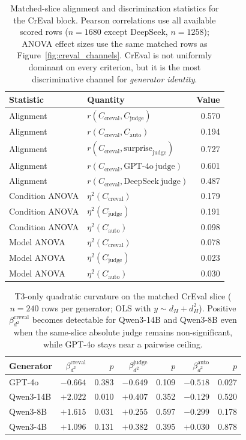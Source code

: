 \documentclass[sigconf,nonacm]{acmart}
\begin{document}
\begin{table}[t]
\centering
\small
\begin{tabular}{llr}
\toprule
Statistic & Quantity & Value \\
\midrule
Alignment & $r(C_{\mathrm{creval}}, C_{\mathrm{judge}})$ & 0.570 \\
Alignment & $r(C_{\mathrm{creval}}, C_{\mathrm{auto}})$ & 0.194 \\
Alignment & $r(C_{\mathrm{creval}}, \mathrm{surprise}_{\mathrm{judge}})$ & 0.727 \\
Alignment & $r(C_{\mathrm{creval}}, \mathrm{GPT\mbox{-}4o\ judge})$ & 0.601 \\
Alignment & $r(C_{\mathrm{creval}}, \mathrm{DeepSeek\ judge})$ & 0.487 \\
Condition ANOVA & $\eta^2(C_{\mathrm{creval}})$ & 0.179 \\
Condition ANOVA & $\eta^2(C_{\mathrm{judge}})$ & 0.191 \\
Condition ANOVA & $\eta^2(C_{\mathrm{auto}})$ & 0.098 \\
Model ANOVA & $\eta^2(C_{\mathrm{creval}})$ & 0.078 \\
Model ANOVA & $\eta^2(C_{\mathrm{judge}})$ & 0.023 \\
Model ANOVA & $\eta^2(C_{\mathrm{auto}})$ & 0.030 \\
\bottomrule
\end{tabular}
\caption{Matched-slice alignment and discrimination statistics for the CrEval block. Pearson correlations use all available scored rows ($n{=}1680$ except DeepSeek, $n{=}1258$); ANOVA effect sizes use the same matched rows as Figure~\ref{fig:creval_channels}. CrEval is not uniformly dominant on every criterion, but it is the most discriminative channel for \emph{generator identity}.}
\label{tab:creval_alignment}
\end{table}

\begin{table}[t]
\centering
\small
\begin{tabular}{lrrrrrr}
\toprule
Generator & $\beta_{d^2}^{\mathrm{creval}}$ & $p$ & $\beta_{d^2}^{\mathrm{judge}}$ & $p$ & $\beta_{d^2}^{\mathrm{auto}}$ & $p$ \\
\midrule
GPT-4o & $-0.664$ & 0.383 & $-0.649$ & 0.109 & $-0.518$ & 0.027 \\
Qwen3-14B & $+2.022$ & 0.010 & $+0.407$ & 0.352 & $-0.129$ & 0.520 \\
Qwen3-8B & $+1.615$ & 0.031 & $+0.255$ & 0.597 & $-0.299$ & 0.178 \\
Qwen3-4B & $+1.096$ & 0.131 & $+0.382$ & 0.395 & $+0.030$ & 0.878 \\
\bottomrule
\end{tabular}
\caption{T3-only quadratic curvature on the matched CrEval slice ($n{=}240$ rows per generator; OLS with $y{\sim}d_H{+}d_H^2$). Positive $\beta_{d^2}^{\mathrm{creval}}$ becomes detectable for Qwen3-14B and Qwen3-8B even when the same-slice absolute judge remains non-significant, while GPT-4o stays near a pairwise ceiling.}
\label{tab:creval_t3_quadratic}
\end{table}
\end{document}
